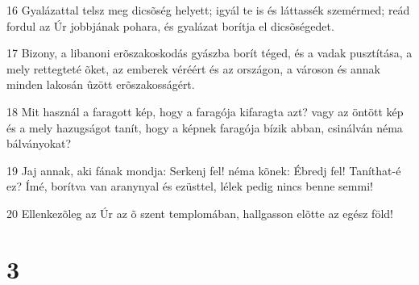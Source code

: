 \par 16 Gyalázattal telsz meg dicsõség helyett; igyál te is és láttassék szemérmed; reád fordul az Úr jobbjának pohara, és gyalázat borítja el dicsõségedet.
\par 17 Bizony, a libanoni erõszakoskodás gyászba borít téged, és a vadak pusztítása, a mely rettegteté õket, az emberek véréért és az országon, a városon és annak minden lakosán ûzött erõszakosságért.
\par 18 Mit használ a faragott kép, hogy a faragója kifaragta azt? vagy az öntött kép és a mely hazugságot tanít, hogy a képnek faragója bízik abban, csinálván néma bálványokat?
\par 19 Jaj annak, aki fának mondja: Serkenj fel! néma kõnek: Ébredj fel! Taníthat-é ez? Ímé, borítva van aranynyal és ezüsttel, lélek pedig nincs benne semmi!
\par 20 Ellenkezõleg az Úr az õ szent templomában, hallgasson elõtte az egész föld!

\chapter{3}

